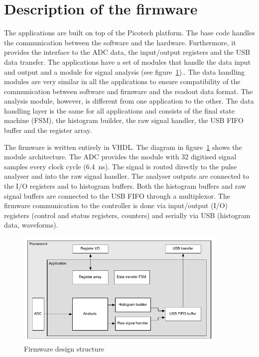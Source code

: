 \section{Description of the firmware}
The applications are built on top of the Picotech platform. The base code handles the communication between the software and the hardware. Furthermore, it provides the interface to the ADC data, the input/output registers and the USB data transfer. The applications have a set of modules that handle the data input and output and a module for signal analysis (see figure~\ref{fig:application}).. The data handling modules are very similar in all the applications to ensure compatibility of the communication between software and firmware and the readout data format. The analysis module, however, is different from one application to the other. The data handling layer is the same for all applications and consists of the final state machine (FSM), the histogram builder, the raw signal handler, the USB FIFO buffer and the register array.

The firmware is written entirely in VHDL. The diagram in figure~\ref{fig:application} shows the module architecture. The ADC provides the module with 32 digitised signal samples every clock cycle (6.4~ns). The signal is routed directly to the pulse analyser and into the raw signal handler. The analyser outputs are connected to the I/O registers and to histogram buffers. Both the histogram buffers and raw signal buffers are connected to the USB FIFO through a multiplexor. The firmware communication to the controller is done via input/output (I/O) registers (control and status registers, counters) and serially via USB (histogram data, waveforms). 


\begin{figure}[!t]
\centering
\includegraphics[width=0.9\textwidth]{05_current_monitoring/plots/application}
\caption{Firmware design structure}
\label{fig:application}
\end{figure}


